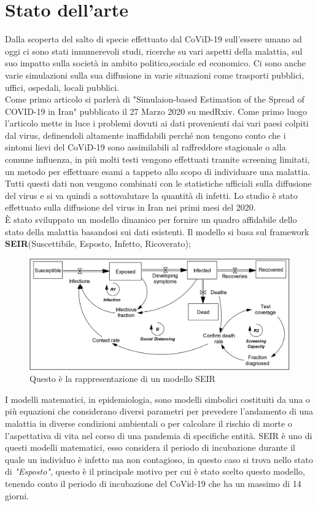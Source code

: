 \documentclass[12pt, openany]{book}
\begin{document}
	\chapter{Stato dell'arte}
		Dalla scoperta del salto di specie effettuato dal CoViD-19 sull'essere umano ad oggi ci sono stati innumerevoli studi, ricerche su vari aspetti della malattia, sul suo impatto sulla società in ambito politico,sociale ed economico. Ci sono anche varie simulazioni sulla sua diffusione in varie situazioni come trasporti pubblici, uffici, ospedali, locali pubblici. \\
		Come primo articolo si parlerà di "Simulaion-based Estimation of the Spread of COVID-19 in Iran"\cite{Iran} pubblicato il 27 Marzo 2020 su medRxiv. Come primo luogo l'articolo mette in luce i problemi dovuti ai dati provenienti dai vari paesi colpiti dal virus, definendoli altamente inaffidabili perché non tengono conto che i sintomi lievi del CoViD-19 sono assimilabili al raffreddore stagionale o alla comune influenza, in più molti testi vengono effettuati tramite screening limitati, un metodo per effettuare esami a tappeto allo scopo di individuare una malattia. Tutti questi dati non vengono combinati con le statistiche ufficiali sulla diffusione del virus e si va quindi a sottovalutare la quantità di infetti.
		Lo studio è stato effettuato sulla diffusione del virus in Iran nei primi mesi del 2020.\\
		È stato sviluppato un modello dinamico per fornire un quadro affidabile dello stato della malattia basandosi sui dati esistenti. Il modello si basa sul framework \textbf{SEIR}(Suscettibile, Esposto, Infetto, Ricoverato); 
		\begin{figure}[H]
			\centering
			\includegraphics[width=1\linewidth]{"Immagini/SEIR"}
			\caption{Questo è la rappresentazione di un modello SEIR }
			\label{fig:SEIR}
		\end{figure}
		I modelli matematici, in epidemiologia, sono modelli simbolici costituiti da una o più equazioni che considerano diversi parametri per prevedere l'andamento di una malattia in diverse condizioni ambientali o per calcolare il rischio di morte o l'aspettativa di vita nel corso di una pandemia di specifiche entità. SEIR è uno di questi modelli matematici, esso considera il periodo di incubazione durante il quale un individuo è infetto ma non contagioso, in questo caso si trova nello stato di \emph{"Esposto"}, questo è il principale motivo per cui è stato scelto questo modello, tenendo conto il periodo di incubazione del CoVid-19 che ha un massimo di 14 giorni.\\
\end{document}
